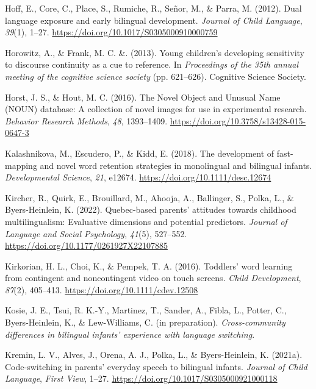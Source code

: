 \documentclass[
  man,floatsintext]{apa7}
\newlength{\cslhangindent}
\newlength{\cslentryspacingunit} %
\newenvironment{CSLReferences}[2] %
 {%
  \setlength{\parindent}{0pt}
  \ifodd #1
  \let\oldpar\par
  \def\par{\hangindent=\cslhangindent\oldpar}
  \fi
  \setlength{\parskip}{#2\cslentryspacingunit}
 }%
 {}
\begin{document}
\begin{CSLReferences}{1}{0}
\leavevmode{}%
Hoff, E., Core, C., Place, S., Rumiche, R., Señor, M., \& Parra, M. (2012). Dual language exposure and early bilingual development. \emph{Journal of Child Language}, \emph{39}(1), 1--27. \url{https://doi.org/10.1017/S0305000910000759}

\leavevmode{}%
Horowitz, A., \& Frank, M. C. \&. (2013). Young children's developing sensitivity to discourse continuity as a cue to reference. In \emph{Proceedings of the 35th annual meeting of the cognitive science society} (pp. 621--626). Cognitive Science Society.

\leavevmode{}%
Horst, J. S., \& Hout, M. C. (2016). The {Novel Object} and {Unusual Name} ({N}{O}{U}{N}) database: A collection of novel images for use in experimental research. \emph{Behavior Research Methods}, \emph{48}, 1393--1409. \url{https://doi.org/10.3758/s13428-015-0647-3}

\leavevmode{}%
Kalashnikova, M., Escudero, P., \& Kidd, E. (2018). The development of fast-mapping and novel word retention strategies in monolingual and bilingual infants. \emph{Developmental Science}, \emph{21}, e12674. \url{https://doi.org/10.1111/desc.12674}

\leavevmode{}%
Kircher, R., Quirk, E., Brouillard, M., Ahooja, A., Ballinger, S., Polka, L., \& Byers-Heinlein, K. (2022). Quebec-based parents' attitudes towards childhood multilingualism: Evaluative dimensions and potential predictors. \emph{Journal of Language and Social Psychology}, \emph{41}(5), 527--552. \url{https://doi.org/10.1177/0261927X22107885}

\leavevmode{}%
Kirkorian, H. L., Choi, K., \& Pempek, T. A. (2016). Toddlers' word learning from contingent and noncontingent video on touch screens. \emph{Child Development}, \emph{87}(2), 405--413. \url{https://doi.org/10.1111/cdev.12508}

\leavevmode{}%
Kosie, J. E., Tsui, R. K.-Y., Martinez, T., Sander, A., Fibla, L., Potter, C., Byers-Heinlein, K., \& Lew-Williams, C. (in preparation). \emph{Cross-community differences in bilingual infants' experience with language switching}.

\leavevmode{}%
Kremin, L. V., Alves, J., Orena, A. J., Polka, L., \& Byers-Heinlein, K. (2021a). Code-switching in parents' everyday speech to bilingual infants. \emph{Journal of Child Language}, \emph{First View}, 1--27. \url{https://doi.org/10.1017/S0305000921000118}


\end{CSLReferences}
\end{document}
